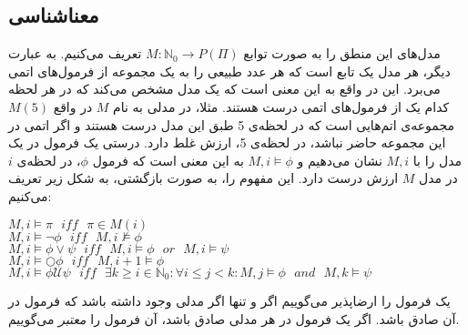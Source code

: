 \subsection{معناشناسی }

مدل‌های این منطق را به صورت توابع
$M:\mathbb{N}_0 \rightarrow \mathit{P}(\Pi)$ 
تعریف می‌کنیم. به عبارت دیگر، هر مدل یک تابع است که هر عدد طبیعی را به یک مجموعه از فرمول‌های اتمی می‌برد. این در واقع به این معنی است که یک مدل مشخص می‌کند که در هر لحظه کدام یک از فرمول‌های اتمی درست هستند. مثلا، در مدلی به نام $M$ در واقع
$M(5)$
مجموعه‌ی اتم‌هایی است که در لحظه‌ی 5 طبق این مدل درست هستند و اگر اتمی در این مجموعه حاضر نباشد، در لحظه‌ی 5، ارزش غلط دارد.
درستی یک فرمول در یک مدل را با 
$M,i$
نشان می‌دهیم و 
$M,i \models \phi$
به این معنی است که فرمول $\phi$، در لحظه‌ی $i$در مدل $M$ ارزش درست دارد. این مفهوم را، به صورت بازگشتی، به شکل زیر تعریف می‌کنیم:


\begin{flushleft}
$	M,i \models \pi \:\:\: \mathit{iff} \:\:\: \pi \in M(i)$\\
$	M,i \models \neg \phi \:\:\: \mathit{iff} \:\:\: M,i\nvDash \phi$\\
$	M,i \models \phi \lor \psi \:\:\: \mathit{iff} \:\:\: M,i \models \phi \:\:\: \mathit{or} \:\:\: M,i \models \psi$\\
	 $M,i \models \bigcirc \phi  \:\:\:  \mathit{iff} \:\:\: M,i+1 \models \phi$\\
	 $M,i \models \phi \mathcal{U} \psi \:\:\: \mathit{iff} \:\:\: 
	 \exists k \geq i \in \mathbb{N}_0: \forall i\leq j< k: M,j \models \phi \:\:\: \mathit{and} \:\:\: M,k \models \psi$
\end{flushleft}


یک فرمول را ارضاپذیر می‌گوییم اگر و تنها اگر مدلی وجود داشته باشد که فرمول در آن صادق باشد.
اگر یک فرمول در هر مدلی صادق باشد، آن فرمول را \emph{معتبر} می‌گوییم.\\



